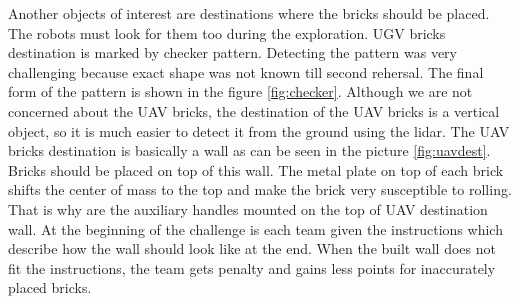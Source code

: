 Another objects of interest are destinations where the bricks should be placed. The robots must look for them too during the exploration. UGV bricks destination is marked by checker pattern. Detecting the pattern was very challenging because exact shape was not known till second rehersal. The final form of the pattern is shown in the figure \ref{fig:checker}. Although we are not concerned about the UAV bricks, the destination of the UAV bricks is a vertical object, so it is much easier to detect it from the ground using the lidar. The UAV bricks destination is basically a wall as can be seen in the picture \ref{fig:uavdest}. Bricks should be placed on top of this wall. The metal plate on top of each brick shifts the center of mass to the top and make the brick very susceptible to rolling. That is why are the auxiliary handles mounted on the top of UAV destination wall. At the beginning of the challenge is each team given the instructions which describe how the wall should look like at the end. When the built wall does not fit the instructions, the team gets penalty and gains less points for inaccurately placed bricks.



